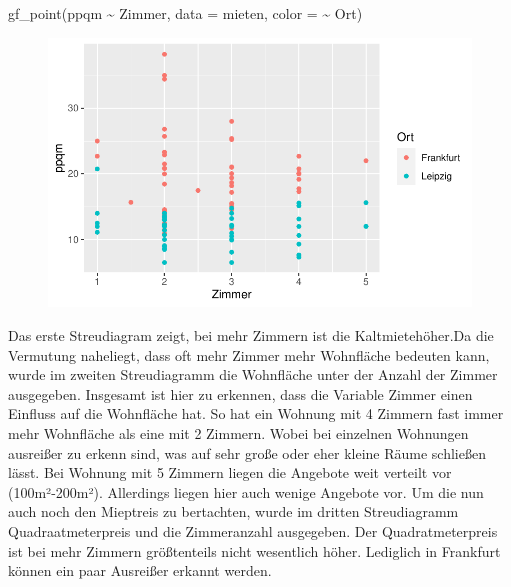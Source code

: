 \documentclass[
  a4paper,
  DIV=11]{scrartcl}
\newenvironment{Shaded}{\begin{snugshade}}{\end{snugshade}}
\newcommand{\AttributeTok}[1]{\textcolor[rgb]{0.40,0.45,0.13}{#1}}
\newcommand{\FunctionTok}[1]{\textcolor[rgb]{0.28,0.35,0.67}{#1}}
\newcommand{\NormalTok}[1]{\textcolor[rgb]{0.00,0.23,0.31}{#1}}
\newcommand{\SpecialCharTok}[1]{\textcolor[rgb]{0.37,0.37,0.37}{#1}}
\begin{document}
\begin{Shaded}
\begin{Highlighting}[]
\FunctionTok{gf\_point}\NormalTok{(ppqm }\SpecialCharTok{\textasciitilde{}}\NormalTok{ Zimmer, }\AttributeTok{data =}\NormalTok{ mieten, }\AttributeTok{color =} \SpecialCharTok{\textasciitilde{}}\NormalTok{ Ort)}
\end{Highlighting}
\end{Shaded}

\begin{figure}[H]

{\centering \includegraphics{Mietmodellierung_files/figure-pdf/unnamed-chunk-14-3.pdf}

}

\end{figure}

Das erste Streudiagram zeigt, bei mehr Zimmern ist die Kaltmietehöher.Da
die Vermutung naheliegt, dass oft mehr Zimmer mehr Wohnfläche bedeuten
kann, wurde im zweiten Streudiagramm die Wohnfläche unter der Anzahl der
Zimmer ausgegeben. Insgesamt ist hier zu erkennen, dass die Variable
Zimmer einen Einfluss auf die Wohnfläche hat. So hat ein Wohnung mit 4
Zimmern fast immer mehr Wohnfläche als eine mit 2 Zimmern. Wobei bei
einzelnen Wohnungen ausreißer zu erkenn sind, was auf sehr große oder
eher kleine Räume schließen lässt. Bei Wohnung mit 5 Zimmern liegen die
Angebote weit verteilt vor (100m²-200m²). Allerdings liegen hier auch
wenige Angebote vor. Um die nun auch noch den Mieptreis zu bertachten,
wurde im dritten Streudiagramm Quadraatmeterpreis und die Zimmeranzahl
ausgegeben. Der Quadratmeterpreis ist bei mehr Zimmern größtenteils
nicht wesentlich höher. Lediglich in Frankfurt können ein paar Ausreißer
erkannt werden.
\end{document}
